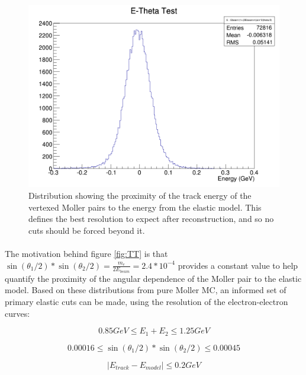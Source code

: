 \documentclass{article}
\begin{document}
	\begin{figure}[H]
  	\includegraphics[width=\linewidth]{PostCollabMeet/Pass3PureMoller/RAW_ETTest.png}
  	\caption{Distribution showing the proximity of the track energy of the vertexed Moller pairs to the energy from the elastic model. This defines the best resolution to expect after reconstruction, and so no cuts should be forced beyond it.}
  	\label{fig:ET}
	\end{figure}

	\paragraph{}
	The motivation behind figure \ref{fig:TT} is that $\sin{\left(\theta_1/2\right)}*\sin{\left(\theta_2/2\right)}=\frac{m_e}{2E_{beam}}=2.4*10^{-4}$ provides a constant value to help quantify the proximity of the angular dependence of the Moller pair to the elastic model. Based on these distributions from pure Moller MC, an informed set of primary elastic cuts can be made, using the resolution of the electron-electron curves:
	
	\begin{equation} \label{eq:ESumCut}
  	0.85 GeV\leq E_1+E_2\leq1.25 GeV
	\end{equation}
	
	\begin{equation} \label{eq:SinSinCut}
  	0.00016\leq \sin{\left(\theta_1/2\right)}*\sin{\left(\theta_2/2\right)} \leq0.00045
	\end{equation}
	
	\begin{equation} \label{eq:ETCut}
  	| E_{track}-E_{model}|\leq0.2 GeV
	\end{equation}
\end{document}
